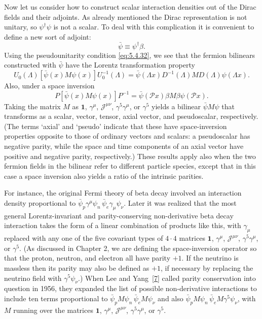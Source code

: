 Now let us consider how to construct scalar interaction densities out of the
Dirac fields and their adjoints. As already mentioned the Dirac representation
is not unitary, so $\psi^\dagger\psi$ is not a scalar. To deal with this
complication it is convenient to define a new sort of adjoint:
\begin{equation}
\bar\psi\equiv\psi^\dagger\beta.
\tag{5.5.55}\label{eq:5.5.55}
\end{equation}
Using the pseudounitarity condition \eqref{eq:5.4.32}, we see that the fermion bilinears
constructed with $\bar\psi$ have the Lorentz transformation property
\begin{equation}
U_0(\Lambda)[\bar\psi(x)M\psi(x)]U_0^{-1}(\Lambda)
=\bar\psi(\Lambda x)D^{-1}(\Lambda)MD(\Lambda)\psi(\Lambda x).
\tag{5.5.56}\label{eq:5.5.56}
\end{equation}
Also, under a space inversion
\begin{equation}
P[\bar\psi(x)M\psi(x)]P^{-1}
=\bar\psi(\mathcal P x)\beta M\beta\psi(\mathcal P x).
\tag{5.5.57}\label{eq:5.5.57}
\end{equation}
Taking the matrix $M$ as $\mathbf{1}$, $\gamma^\mu$,
$\mathcal{J}^{\mu\nu}$, $\gamma^5\gamma^\mu$, or $\gamma^5$ yields a bilinear
$\bar\psi M\psi$ that transforms as a scalar, vector, tensor, axial vector,
and pseudoscalar, respectively. (The terms `axial' and `pseudo' indicate that
these have space-inversion properties opposite to those of ordinary vectors
and scalars: a pseudoscalar has negative parity, while the space and time
components of an axial vector have positive and negative parity, respectively.)
These results apply also when the two fermion fields in the bilinear refer to
different particle species, except that in this case a space inversion also
yields a ratio of the intrinsic parities.

For instance, the original Fermi theory of beta decay involved an interaction
density proportional to $\bar\psi_p\gamma^\mu\psi_n\,
\bar\psi_e\gamma_\mu\psi_\nu$. Later it was realized that the most general
Lorentz-invariant and parity-conserving non-derivative beta decay interaction
takes the form of a linear combination of products like this, with $\gamma_\mu$
replaced with any one of the five covariant types of $4\cdot4$ matrices
$\mathbf{1}$, $\gamma^\mu$, $\mathcal{J}^{\mu\nu}$,
$\gamma^5\gamma^\mu$, or $\gamma^5$. (As discussed in Chapter 2, we are
defining the space-inversion operator so that the proton, neutron, and electron
all have parity $+1$. If the neutrino is massless then its parity may also be
defined as $+1$, if necessary by replacing the neutrino field with
$\gamma^5\psi_\nu$.) When Lee and Yang~\hyperref[ref:5.7]{[7]} called parity conservation into
question in 1956, they expanded the list of possible non-derivative
interactions to include ten terms proportional to
$\bar\psi_pM\psi_n\,\bar\psi_eM\psi_\nu$ and also
$\bar\psi_pM\psi_n\,\bar\psi_eM\gamma^5\psi_\nu$, with $M$ running over the
matrices $\mathbf{1}$, $\gamma^\mu$, $\mathcal{J}^{\mu\nu}$,
$\gamma^5\gamma^\mu$, or $\gamma^5$.

